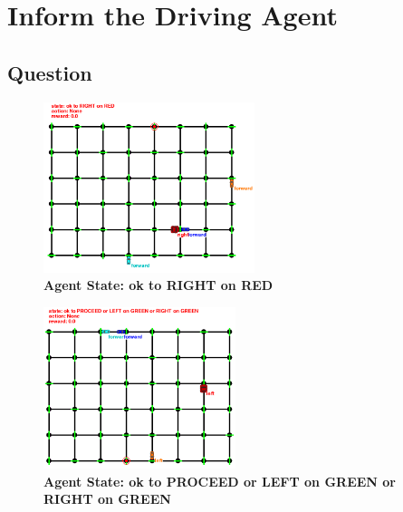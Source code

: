 \documentclass[twoside,openright,titlepage,numbers=noenddot,headinclude,%
               footinclude=true,cleardoublepage=empty,abstractoff,BCOR=5mm,%
               paper=a4,fontsize=11pt,ngerman,american]{scrreprt}
\numberwithin{theorem}{chapter}
\numberwithin{definition}{chapter}
\numberwithin{algorithm}{chapter}
\numberwithin{figure}{chapter}
\numberwithin{table}{chapter}
\numberwithin{equation}{chapter}
\begin{document}
\chapter*{Inform the Driving Agent}

\section*{Question}

\begin{figure}[!hbtp]
\centering
    \includegraphics[width=0.55\textwidth]{figures/oktoRIGHTonRED}
  
    \caption{\textbf{Agent State: ok to RIGHT on RED}}\label{fig:state1}
\end{figure}

\begin{figure}[!hbtp]
\centering
    \includegraphics[width=0.5\textwidth]{figures/oktoPROCEEDorLEFTonGREEN}
  
    \caption{\textbf{Agent State: ok to PROCEED or LEFT on GREEN or RIGHT on GREEN}}\label{fig:state2}
\end{figure}
\end{document}

